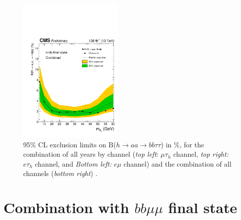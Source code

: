 \begin{figure}[h!]
\begin{center}
        \includegraphics[width=0.45\textwidth]{figures/ch-13-results/Limit_all_prelim.pdf}
    \end{center}
    \caption[95\% CL exclusion limits on B($h\rightarrow aa\rightarrow bb\tau\tau$) in \%.]{95\% CL exclusion limits on B($h\rightarrow aa\rightarrow bb\tau\tau$) in \%, for the combination of all years by channel (\textit{top left}: $\mu\tau_{h}$ channel, \textit{top right:} $e\tau_{h}$ channel, and \textit{Bottom left:} $e\mu$ channel) and the combination of all channels (\textit{bottom right}) \cite{CMS-AN-20-213}.}
    \label{fig:results_limits}
\end{figure}



\section{Combination with $bb\mu\mu$ final state}
